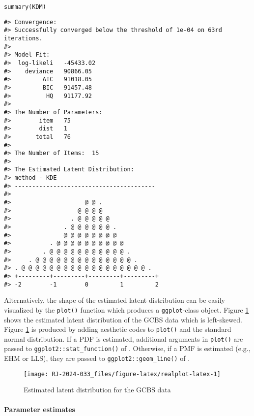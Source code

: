 \begin{verbatim}
summary(KDM)
\end{verbatim}

\begin{verbatim}
#> Convergence:  
#> Successfully converged below the threshold of 1e-04 on 63rd iterations. 
#> 
#> Model Fit:  
#>  log-likeli   -45433.02 
#>    deviance   90866.05 
#>         AIC   91018.05 
#>         BIC   91457.48 
#>          HQ   91177.92 
#> 
#> The Number of Parameters:  
#>        item   75 
#>        dist   1 
#>       total   76 
#> 
#> The Number of Items:  15 
#> 
#> The Estimated Latent Distribution:  
#> method - KDE 
#> ----------------------------------------
#>                                           
#>                     @ @ .                 
#>                   @ @ @ @                 
#>                 . @ @ @ @ @               
#>               . @ @ @ @ @ @ .             
#>               @ @ @ @ @ @ @ @             
#>           . @ @ @ @ @ @ @ @ @ @           
#>         . @ @ @ @ @ @ @ @ @ @ @ .         
#>     . @ @ @ @ @ @ @ @ @ @ @ @ @ @ .       
#> . @ @ @ @ @ @ @ @ @ @ @ @ @ @ @ @ @ @ .   
#> +---------+---------+---------+---------+
#> -2        -1        0         1         2
\end{verbatim}

Alternatively, the shape of the estimated latent distribution can be
easily visualized by the \texttt{plot()} function which produces a \texttt{ggplot}-class object.
Figure
\ref{fig:realplot-latex}
shows the estimated latent distribution of the GCBS data which is
left-skewed. Figure
\ref{fig:realplot-latex}
is produced by adding aesthetic codes to \texttt{plot()} and the standard normal distribution.
If a PDF is estimated,
additional arguments in \texttt{plot()} are passed to \texttt{ggplot2::stat\_function()} of
 \citep{ggplot2}. Otherwise, if a PMF is estimated (e.g.,
EHM or LLS), they are passed to \texttt{ggplot2::geom\_line()} of .

\begin{figure}[H]

{\centering \texttt{[image: RJ-2024-033\_files/figure-latex/realplot-latex-1]} 

}

\caption{Estimated latent distribution for the GCBS data}\label{fig:realplot-latex}
\end{figure}

\hypertarget{parameter-estimates-1}{%
\paragraph{Parameter estimates}\label{parameter-estimates-1}}

